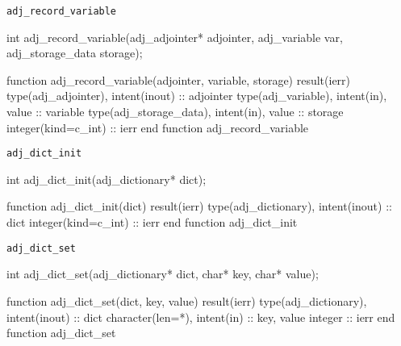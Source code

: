 \begin{boxwithtitle}{\texttt{adj_record_variable}}
\begin{minipage}{\columnwidth}
\begin{ccode}
  int adj_record_variable(adj_adjointer* adjointer, adj_variable var, 
                          adj_storage_data storage);
\end{ccode}
\begin{fortrancode}
  function adj_record_variable(adjointer, variable, storage) result(ierr) 
    type(adj_adjointer), intent(inout) :: adjointer
    type(adj_variable), intent(in), value :: variable
    type(adj_storage_data), intent(in), value :: storage
    integer(kind=c_int) :: ierr
  end function adj_record_variable
\end{fortrancode}
\end{minipage}
\end{boxwithtitle}


\begin{boxwithtitle}{\texttt{adj_dict_init}}
\begin{minipage}{\columnwidth}
\begin{ccode}
  int adj_dict_init(adj_dictionary* dict);
\end{ccode}
\begin{fortrancode}
  function adj_dict_init(dict) result(ierr)
    type(adj_dictionary), intent(inout) :: dict
    integer(kind=c_int) :: ierr
  end function adj_dict_init
\end{fortrancode}
\end{minipage}
\end{boxwithtitle}


\begin{boxwithtitle}{\texttt{adj_dict_set}}
\begin{minipage}{\columnwidth}
\begin{ccode}
  int adj_dict_set(adj_dictionary* dict, char* key, char* value);
\end{ccode}
\begin{fortrancode}
  function adj_dict_set(dict, key, value) result(ierr)
    type(adj_dictionary), intent(inout) :: dict
    character(len=*), intent(in) :: key, value
    integer :: ierr
  end function adj_dict_set
\end{fortrancode}
\end{minipage}
\end{boxwithtitle}


